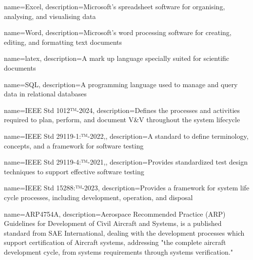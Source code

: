 %

\glstoctrue
\makeglossaries


{
        name=Excel,
        description={Microsoft’s spreadsheet software for organising, analysing, and visualising data}
}

{
        name=Word,
        description={Microsoft’s word processing software for creating, editing, and formatting text documents}
}

{
        name=latex,
        description={A mark up language specially suited for scientific documents}
}

{
        name=SQL,
        description={A programming language used to manage and query data in relational databases}
}


{
        name=IEEE Std 1012™-2024,
        description={Defines the processes and activities required to plan, perform, and document V\&V throughout the system lifecycle}
}

{
        name=IEEE Std 29119-1:™-2022,,
        description={A standard to define terminology, concepts, and a framework for software testing}
}

{
        name=IEEE Std 29119-4:™-2021,,
        description={Provides standardized test design techniques to support effective software testing}
}

{
        name=IEEE Std 15288:™-2023,
        description={Provides a framework for system life cycle processes, including development, operation, and disposal}
}

{
        name=ARP4754A,
        description={Aerospace Recommended Practice (ARP) Guidelines for Development of Civil Aircraft and Systems, is a published standard from SAE International, dealing with the development processes which support certification of Aircraft systems, addressing "the complete aircraft development cycle, from systems requirements through systems verification."}
}

